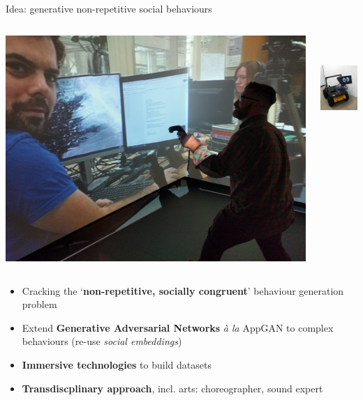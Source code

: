 \documentclass[xcolor=table]{beamer}
\begin{document}
\begin{frame}{Idea: generative non-repetitive social behaviours}

    \centering
    \begin{columns}
        \begin{column}{0.6\linewidth}
            \centering
            \includegraphics[width=.7\linewidth]{generative-behaviours/immersive-teleoperation}
        \end{column}
        \begin{column}{0.4\linewidth}
            \centering
            \includegraphics[height=4cm]{generative-behaviours/husky}
        \end{column}
    \end{columns}

    \vspace{1em}

            \scriptsize
            \begin{itemize}
                \item Cracking the `\textbf{non-repetitive, socially congruent}' behaviour
                    generation problem
                \item Extend \textbf{Generative Adversarial Networks} \emph{à la} AppGAN to complex
                    behaviours (re-use \emph{social embeddings})
                \item \textbf{Immersive technologies} to build datasets
                \item \textbf{Transdiscplinary approach}, incl. arts: choreographer, sound
                    expert
            \end{itemize}
\end{frame}
\end{document}
